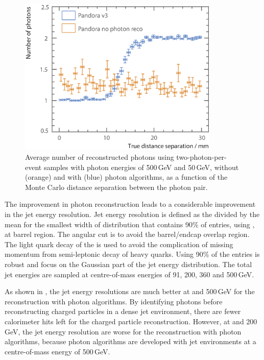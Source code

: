 \begin{figure}[!tbph]
\centering
\includegraphics[width=0.85\textwidth]{photon/nPhotonVSnoPhotonReco3}
\caption[Average number of photons using two photons of 500 and 50\,GeV per event sample.]
{Average number of reconstructed  photons using two-photon-per-event samples with photon energies of  500\,GeV and 50\,GeV, without (orange) and with (blue) photon algorithms, as a function of the Monte Carlo distance separation between the photon pair.}
\label{fig:photonDoublePerformanceNoReco}
\end{figure}




The improvement in photon reconstruction leads to a considerable improvement in the jet energy resolution. Jet energy resolution is defined as the \rms divided by the mean for the smallest width of distribution that contains 90\% of entries, using \eeZuds, at barrel region. The angular cut is to avoid the barrel/endcap overlap region. The light quark decay of the \Zprime is used   to avoid the complication of missing momentum from semi-leptonic decay of heavy quarks. Using 90\% of the entries is robust and focus on the Gaussian part of the jet energy distribution. The total jet energies are   sampled at centre-of-mass energies of 91, 200, 360 and 500\,GeV.

As shown in , the jet energy resolutions are much better at  and 500\,GeV for the reconstruction with photon algorithms. By identifying photons before reconstructing charged particles in a dense jet environment, there are fewer calorimeter hits left for the charged particle reconstruction. However, at  and 200\,GeV, the jet energy resolution are worse  for the reconstruction with photon algorithms, because photon algorithms are developed with  jet environments at a centre-of-mass energy of 500\,GeV.

